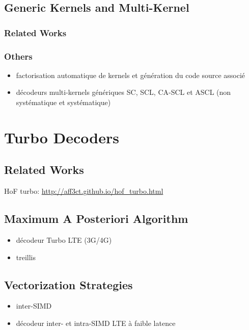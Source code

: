 \subsection{Generic Kernels and Multi-Kernel}

\subsubsection{Related Works}

\subsubsection{Others}

\begin{itemize}
  \item factorisation automatique de kernels et génération du code source associé
  \item décodeurs multi-kernels génériques SC, SCL, CA-SCL et ASCL (non systématique et systématique)
\end{itemize}

\section{Turbo Decoders~\cite{Cassagne2016a}}

\subsection{Related Works}

HoF turbo: \url{http://aff3ct.github.io/hof_turbo.html}

\subsection{Maximum A Posteriori Algorithm}

\begin{itemize}
  \item décodeur Turbo LTE (3G/4G)
  \item treillis
\end{itemize}

\subsection{Vectorization Strategies}

\begin{itemize}
  \item inter-SIMD
  \item décodeur inter- et intra-SIMD LTE à faible latence
\end{itemize}

